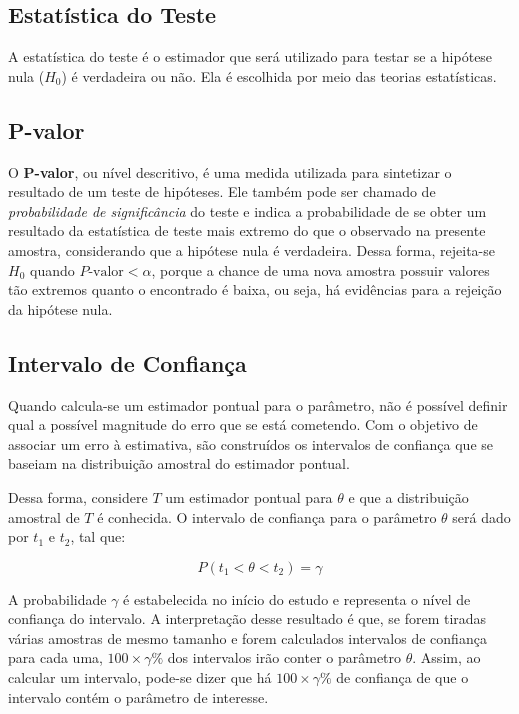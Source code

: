\documentclass[
]{estat/estat}
\begin{document}
\subsection{Estatística do Teste}\label{estatuxedstica-do-teste}

A estatística do teste é o estimador que será utilizado para testar se a
hipótese nula (\(H_{0}\)) é verdadeira ou não. Ela é escolhida por meio
das teorias estatísticas.

\subsection{P-valor}\label{p-valor}

O \textbf{P-valor}, ou nível descritivo, é uma medida utilizada para
sintetizar o resultado de um teste de hipóteses. Ele também pode ser
chamado de \emph{probabilidade de significância} do teste e indica a
probabilidade de se obter um resultado da estatística de teste mais
extremo do que o observado na presente amostra, considerando que a
hipótese nula é verdadeira. Dessa forma, rejeita-se \(H_{0}\) quando
\(P\text{-valor} < \alpha\), porque a chance de uma nova amostra possuir
valores tão extremos quanto o encontrado é baixa, ou seja, há evidências
para a rejeição da hipótese nula.

\subsection{Intervalo de Confiança}\label{intervalo-de-confianuxe7a}

Quando calcula-se um estimador pontual para o parâmetro, não é possível
definir qual a possível magnitude do erro que se está cometendo. Com o
objetivo de associar um erro à estimativa, são construídos os intervalos
de confiança que se baseiam na distribuição amostral do estimador
pontual.

Dessa forma, considere \(T\) um estimador pontual para \(\theta\) e que
a distribuição amostral de \(T\) é conhecida. O intervalo de confiança
para o parâmetro \(\theta\) será dado por \(t_{1}\) e \(t_{2}\), tal
que:

\[ P(t_{1} < \theta < t_{2}) = \gamma \]

A probabilidade \(\gamma\) é estabelecida no início do estudo e
representa o nível de confiança do intervalo. A interpretação desse
resultado é que, se forem tiradas várias amostras de mesmo tamanho e
forem calculados intervalos de confiança para cada uma,
\(100 \times \gamma \%\) dos intervalos irão conter o parâmetro
\(\theta\). Assim, ao calcular um intervalo, pode-se dizer que há
\(100 \times \gamma \%\) de confiança de que o intervalo contém o
parâmetro de interesse.
\end{document}
